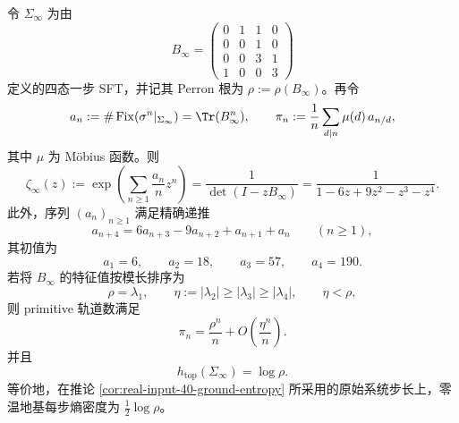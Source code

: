 \begin{theorem}\label{thm:xi-zero-temperature-fourstate-artin-mazur-zeta-primitive-asymptotic}
令 \(\Sigma_\infty\) 为由
\[
B_\infty=
\begin{pmatrix}
0&1&1&0\\
0&0&1&0\\
0&0&3&1\\
1&0&0&3
\end{pmatrix}
\]
定义的四态一步 SFT，并记其 Perron 根为 \(\rho:=\rho(B_\infty)\)。再令
\[
a_n:=\#\operatorname{Fix}(\sigma^n|_{\Sigma_\infty})=\Tr(B_\infty^n),
\qquad
\pi_n:=\frac{1}{n}\sum_{d\mid n}\mu(d)\,a_{n/d},
\]
其中 \(\mu\) 为 Möbius 函数。则
\[
\zeta_\infty(z)
:=
\exp\!\left(\sum_{n\ge 1}\frac{a_n}{n}z^n\right)
=
\frac{1}{\det(I-zB_\infty)}
=
\frac{1}{1-6z+9z^2-z^3-z^4}.
\]
此外，序列 \((a_n)_{n\ge 1}\) 满足精确递推
\[
a_{n+4}=6a_{n+3}-9a_{n+2}+a_{n+1}+a_n
\qquad(n\ge 1),
\]
其初值为
\[
a_1=6,\qquad a_2=18,\qquad a_3=57,\qquad a_4=190.
\]
若将 \(B_\infty\) 的特征值按模长排序为
\[
\rho=\lambda_1,
\qquad
\eta:=|\lambda_2|\ge |\lambda_3|\ge |\lambda_4|,
\qquad
\eta<\rho,
\]
则 primitive 轨道数满足
\[
\pi_n=\frac{\rho^n}{n}+O\!\left(\frac{\eta^n}{n}\right).
\]
并且
\[
h_{\mathrm{top}}(\Sigma_\infty)=\log\rho.
\]
等价地，在推论 \ref{cor:real-input-40-ground-entropy} 所采用的原始系统步长上，零温地基每步熵密度为 \(\tfrac12\log\rho\)。
\end{theorem}
